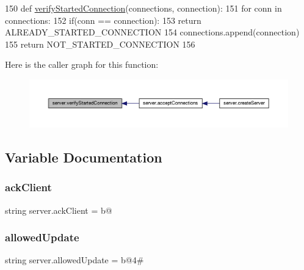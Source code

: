 \begin{DoxyCode}
150 \textcolor{keyword}{def }\hyperlink{namespaceserver_a4e6504daf55d2ef34d4d2ea5b30074f3}{verifyStartedConnection}(connections, connection):
151      \textcolor{keywordflow}{for} conn \textcolor{keywordflow}{in} connections:
152           if(conn == connection):
153                \textcolor{keywordflow}{return} ALREADY\_STARTED\_CONNECTION
154      connections.append(connection)
155      \textcolor{keywordflow}{return} NOT\_STARTED\_CONNECTION
156 
\end{DoxyCode}
Here is the caller graph for this function\+:
\nopagebreak
\begin{figure}[H]
\begin{center}
\leavevmode
\includegraphics[width=350pt]{namespaceserver_a4e6504daf55d2ef34d4d2ea5b30074f3_icgraph}
\end{center}
\end{figure}


\subsection{Variable Documentation}
\mbox{\label{namespaceserver_ad00458dfe9ab743680203b756f8345bf}} 
\subsubsection{\texorpdfstring{ack\+Client}{ackClient}}
{\footnotesize\ttfamily string server.\+ack\+Client = b\textquotesingle{}@\textquotesingle{}}

\mbox{\label{namespaceserver_a097162d68fd6d2855bf5eb81507db414}} 
\subsubsection{\texorpdfstring{allowed\+Update}{allowedUpdate}}
{\footnotesize\ttfamily string server.\+allowed\+Update = b\textquotesingle{}@4\#\textquotesingle{}}

